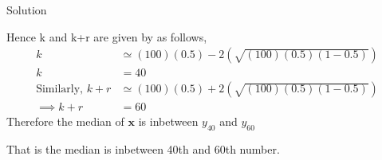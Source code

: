 \documentclass{beamer}
\theoremstyle{remark}
\numberwithin{equation}{subsection}
\let\vec\mathbf
\begin{document}
\begin{frame}{Solution}

    Hence k and k+r are given by as follows,
    \begin{align}
        k &\simeq (100)(0.5) - 2(\sqrt{(100)(0.5)(1-0.5)}) \\
        k &= 40 \\
        \text{Similarly, } k+r &\simeq (100)(0.5) + 2(\sqrt{(100)(0.5)(1-0.5)}) \\
        \implies k+r &= 60
    \end{align}
    Therefore the median of $\vec{x}$ is inbetween $y_{40}$ and $y_{60}$\newline
    
    That is the median is inbetween 40th and 60th number.
\end{frame}
\end{document}
